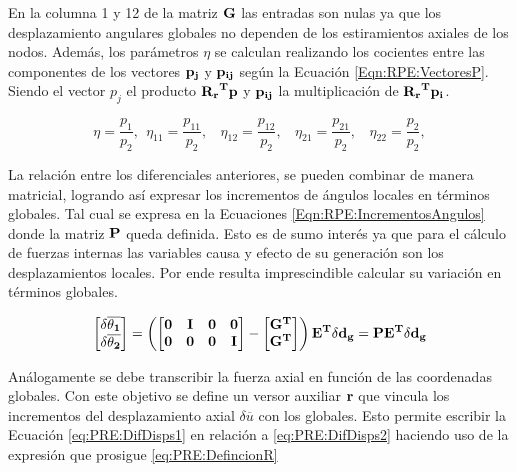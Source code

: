 En la columna 1 y 12 de la matriz $\bf{G}$ las entradas son nulas ya que los desplazamiento angulares globales no dependen de los estiramientos axiales de los nodos. Además, los parámetros $\eta$ se calculan realizando
los cocientes entre las componentes de los vectores $\bf{p}_j$ y $\bf{p_{ij}}$ según la Ecuación \eqref{Eqn:RPE:VectoresP}. Siendo el vector $p_j$ el producto $\bf{R_r}^T\bf{p}$ y $\bf{p_{ij}}$ la multiplicación de $\bf{R_r}^T\bf{p}_i$.

\begin{equation}\label{Eqn:RPE:VectoresP}
	\eta = \frac{p_1}{p_2}, ~~\eta_{11} = \frac{p_{11}}{p_2}, ~~~~\eta_{12} = \frac{p_{12}}{p_2}, ~~~~\eta_{21} = \frac{p_{21}}{p_2}, ~~~~\eta_{22} = \frac{p_{2}}{p_2},
\end{equation}


La relación entre los diferenciales anteriores, se pueden combinar de manera matricial, logrando así expresar los incrementos de ángulos locales en términos globales. Tal cual se expresa en la Ecuaciones \eqref{Eqn:RPE:IncrementosAngulos} donde la matriz $\bf{P}$ queda definida. Esto es de sumo interés ya que para el cálculo de fuerzas internas las variables causa y efecto de su generación son los desplazamientos locales. Por ende resulta imprescindible calcular su variación en términos globales.


\begin{equation}\label{Eqn:RPE:IncrementosAngulos}
	\begin{bmatrix}
		\bf{\delta\overline{\theta_1}}\\
		\bf{\delta\overline{\theta_2}}
	\end{bmatrix}=\left ( \begin{bmatrix}
		\bf{0} &\bf{I}  & \bf{0} &\bf{0} \\
		\bf{0}&\bf{0}  &\bf{0}  & \bf{I}
	\end{bmatrix}-\begin{bmatrix}
		\bf{G}^T\\
		\bf{G}^T
	\end{bmatrix} \right )\bf{E}^T \delta \bf{d_g}=\bf{P}\bf{E}^T \delta \bf{d_g}
\end{equation}

Análogamente se debe transcribir la fuerza axial en función de las coordenadas globales. Con este objetivo se define un versor auxiliar  $ \bf{r}$ que vincula los incrementos del desplazamiento axial $\delta \overline{u}$ con los globales. Esto permite escribir la Ecuación \eqref{eq:PRE:DifDisps1} en relación a  \eqref{eq:PRE:DifDisps2} haciendo uso de la expresión que prosigue \eqref{eq:PRE:DefincionR}

